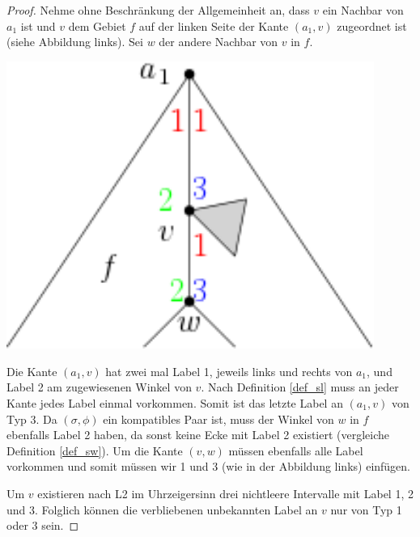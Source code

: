 \begin{proof}
Nehme ohne Beschränkung der Allgemeinheit an, dass $v$ ein Nachbar von $a_1$ ist und $v$ dem Gebiet $f$ auf der linken Seite der Kante $(a_1,v)$ zugeordnet ist (siehe Abbildung links). Sei $w$ der andere Nachbar von $v$ in $f$. 

\begin{minipage}{0.4\textwidth}
\begin{center}
    \includegraphics[width=0.9\textwidth]{lem4.png}
  \end{center}
\end{minipage}
\begin{minipage}{0.568\textwidth}
\vspace{1mm}
Die Kante $(a_1,v)$ hat zwei mal Label 1, jeweils links und rechts von $a_1$, und Label 2 am zugewiesenen Winkel von $v$. Nach Definition \ref{def_sl} muss an jeder Kante jedes Label einmal vorkommen. Somit ist das letzte Label an $(a_1,v)$ von Typ 3. Da $(\sigma,\phi)$ ein kompatibles Paar ist, muss der Winkel von $w$ in $f$ ebenfalls Label 2 haben, da sonst keine Ecke mit Label 2 existiert (vergleiche Definition \ref{def_sw}). Um die Kante $(v,w)$ müssen ebenfalls alle Label vorkommen und somit müssen wir 1 und 3 (wie in der Abbildung links) einfügen. 
\vspace{1mm}
\end{minipage}

Um $v$ existieren nach L2 im Uhrzeigersinn drei nichtleere Intervalle mit Label 1, 2 und 3. Folglich können die verbliebenen unbekannten Label an $v$ nur von Typ 1 oder 3 sein.
\end{proof}

